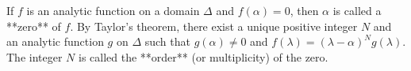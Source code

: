 If $f$ is an analytic function on a domain $\Delta$ and $f(\alpha) = 0$, then $\alpha$ is called a **zero** of $f$. By Taylor's theorem, there exist a unique positive integer $N$ and an analytic function $g$ on $\Delta$ such that $g(\alpha) \neq 0$ and $f(\lambda) = (\lambda - \alpha)^N g(\lambda)$. The integer $N$ is called the **order** (or multiplicity) of the zero.
